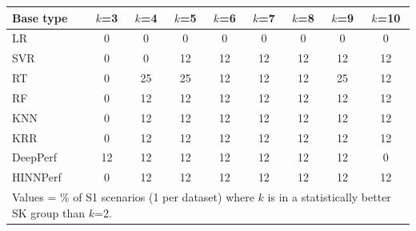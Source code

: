 \begin{tabular}{lcccccccc}
\toprule
Base type & $k$=3 & $k$=4 & $k$=5 & $k$=6 & $k$=7 & $k$=8 & $k$=9 & $k$=10 \\
\midrule
LR & 0 & 0 & 0 & 0 & 0 & 0 & 0 & 0 \\
SVR & 0 & 0 & 12 & 12 & 12 & 12 & 12 & 12 \\
RT & 0 & 25 & 25 & 12 & 12 & 12 & 25 & 12 \\
RF & 0 & 12 & 12 & 12 & 12 & 12 & 12 & 12 \\
KNN & 0 & 12 & 12 & 12 & 12 & 12 & 12 & 12 \\
KRR & 0 & 12 & 12 & 12 & 12 & 12 & 12 & 12 \\
DeepPerf & 12 & 12 & 12 & 12 & 12 & 12 & 12 & 0 \\
HINNPerf & 0 & 12 & 12 & 12 & 12 & 12 & 12 & 12 \\
\bottomrule
\multicolumn{9}{l}{\footnotesize Values = \% of S1 scenarios (1 per dataset) where $k$ is in a statistically better SK group than $k$=2.}} \\
\end{tabular}
